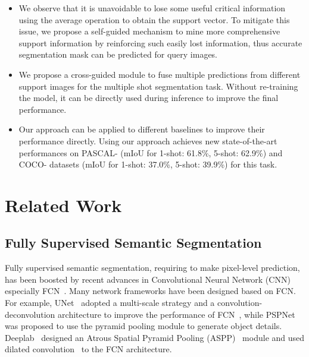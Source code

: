 \documentclass[final]{cvpr}
\begin{document}
\begin{itemize}	
	
	\item  We observe that it is unavoidable to lose some useful critical information using the average operation to obtain the support vector. To mitigate this issue, we propose a self-guided mechanism to mine more comprehensive support information by reinforcing such easily lost information, thus accurate segmentation mask can be predicted for query images. 
	
	\item We propose a cross-guided module to fuse multiple predictions from different support images for the multiple shot segmentation task. Without re-training the model, it can be directly used during inference to improve the final performance.
	
	\item Our approach can be applied to different baselines to improve their performance directly. Using our approach achieves new state-of-the-art performances on PASCAL- (mIoU for 1-shot: 61.8\%, 5-shot: 62.9\%) and COCO- datasets (mIoU for 1-shot: 37.0\%, 5-shot: 39.9\%) for this task. 
\end{itemize}

\section{Related Work}
\subsection{Fully Supervised Semantic Segmentation}
Fully supervised semantic segmentation, requiring to make pixel-level prediction, has been boosted by recent advances in Convolutional Neural Network (CNN) especially FCN~\cite{long2015fully}. Many network frameworks have been designed based on FCN. For example, UNet~\cite{ronneberger2015u} adopted a multi-scale strategy and a convolution-deconvolution architecture to improve the performance of FCN~\cite{long2015fully}, while PSPNet~\cite{zhao2017pyramid} was proposed to use the pyramid pooling module to generate object details. Deeplab~\cite{chen2018deeplab, chen2018encoder} designed an Atrous Spatial Pyramid Pooling (ASPP)~\cite{chen2017rethinking} module and used dilated convolution~\cite{chen2014semantic} to the FCN architecture.  
\end{document}
